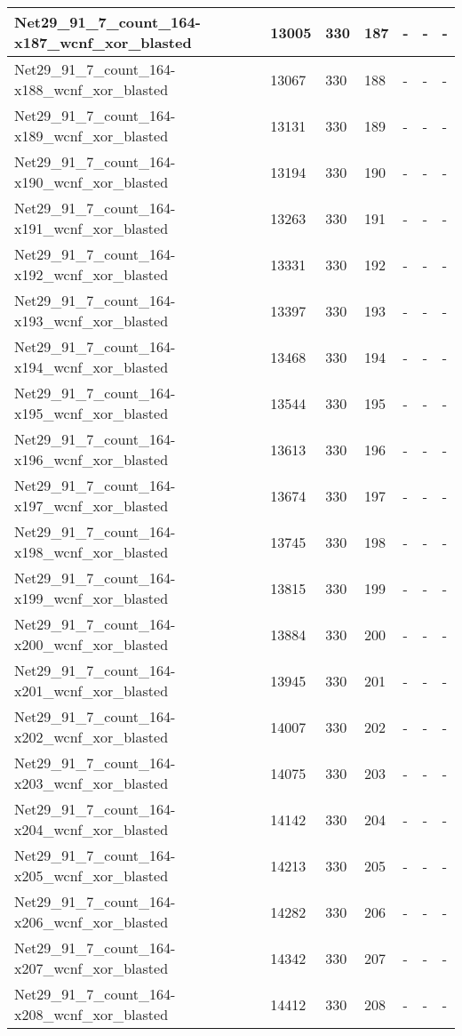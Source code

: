 \begin{scriptsize}
\begin{longtable}{|p{5cm}|l|l|l|l|l|l|}
Net29\_91\_7\_count\_164-x187\_wcnf\_xor\_blasted&13005&330&187&-&-&- \\ \hline 
Net29\_91\_7\_count\_164-x188\_wcnf\_xor\_blasted&13067&330&188&-&-&- \\ \hline 
Net29\_91\_7\_count\_164-x189\_wcnf\_xor\_blasted&13131&330&189&-&-&- \\ \hline 
Net29\_91\_7\_count\_164-x190\_wcnf\_xor\_blasted&13194&330&190&-&-&- \\ \hline 
Net29\_91\_7\_count\_164-x191\_wcnf\_xor\_blasted&13263&330&191&-&-&- \\ \hline 
Net29\_91\_7\_count\_164-x192\_wcnf\_xor\_blasted&13331&330&192&-&-&- \\ \hline 
Net29\_91\_7\_count\_164-x193\_wcnf\_xor\_blasted&13397&330&193&-&-&- \\ \hline 
Net29\_91\_7\_count\_164-x194\_wcnf\_xor\_blasted&13468&330&194&-&-&- \\ \hline 
Net29\_91\_7\_count\_164-x195\_wcnf\_xor\_blasted&13544&330&195&-&-&- \\ \hline 
Net29\_91\_7\_count\_164-x196\_wcnf\_xor\_blasted&13613&330&196&-&-&- \\ \hline 
Net29\_91\_7\_count\_164-x197\_wcnf\_xor\_blasted&13674&330&197&-&-&- \\ \hline 
Net29\_91\_7\_count\_164-x198\_wcnf\_xor\_blasted&13745&330&198&-&-&- \\ \hline 
Net29\_91\_7\_count\_164-x199\_wcnf\_xor\_blasted&13815&330&199&-&-&- \\ \hline 
Net29\_91\_7\_count\_164-x200\_wcnf\_xor\_blasted&13884&330&200&-&-&- \\ \hline 
Net29\_91\_7\_count\_164-x201\_wcnf\_xor\_blasted&13945&330&201&-&-&- \\ \hline 
Net29\_91\_7\_count\_164-x202\_wcnf\_xor\_blasted&14007&330&202&-&-&- \\ \hline 
Net29\_91\_7\_count\_164-x203\_wcnf\_xor\_blasted&14075&330&203&-&-&- \\ \hline 
Net29\_91\_7\_count\_164-x204\_wcnf\_xor\_blasted&14142&330&204&-&-&- \\ \hline 
Net29\_91\_7\_count\_164-x205\_wcnf\_xor\_blasted&14213&330&205&-&-&- \\ \hline 
Net29\_91\_7\_count\_164-x206\_wcnf\_xor\_blasted&14282&330&206&-&-&- \\ \hline 
Net29\_91\_7\_count\_164-x207\_wcnf\_xor\_blasted&14342&330&207&-&-&- \\ \hline 
Net29\_91\_7\_count\_164-x208\_wcnf\_xor\_blasted&14412&330&208&-&-&- \\ \hline 

\end{longtable}
\end{scriptsize}
